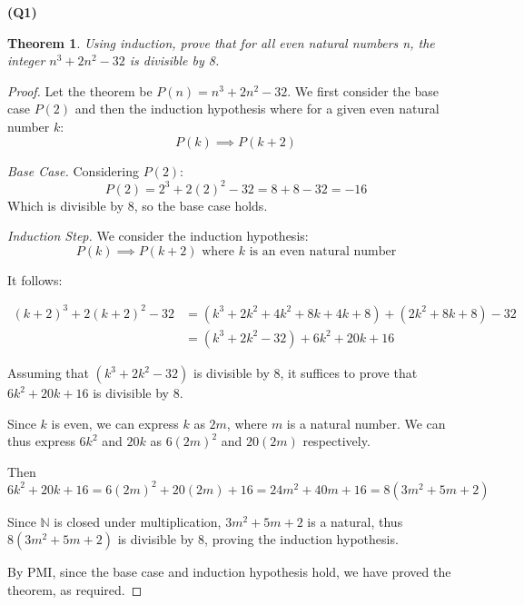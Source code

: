 \documentclass[12pt, a4paper]{article}
\newcommand{\N}{\mathbb{N}}
\newtheorem{theorem}{Theorem}
\begin{document}
\noindent\textbf{(Q1)}

\begin{theorem}
    Using induction, prove that for all even natural numbers \emph{n}, the integer
    $n^3 + 2n^2 - 32$ is divisible by 8.
\end{theorem}

\begin{proof}
    Let the theorem be $P(n) = n^3 + 2n^2 - 32$. We first consider the base case $P(2)$
    and then the induction hypothesis where for a given even natural number $k$:
    \[
        P(k) \implies P(k + 2)
    \]

    \noindent\textit{Base Case.} Considering $P(2)$:
    \[
        P(2) = 2^3 + 2(2)^2 - 32 = 8 + 8 - 32 = -16
    \]
    Which is divisible by 8, so the base case holds.

    \noindent\textit{Induction Step.} We consider the induction hypothesis:
    \[
        P(k) \implies P(k + 2) \text{ where $k$ is an even natural number}
    \]

    It follows:
    
    \begin{align*}
        (k + 2)^3 + 2(k + 2)^2 - 32 & = (k^3 + 2k^2 + 4k^2 + 8k + 4k + 8) + (2k^2 + 8k + 8) - 32\\
        & = (k^3 + 2k^2 - 32) + 6k^2 + 20k + 16
    \end{align*}

    Assuming that $(k^3 + 2k^2 - 32)$ is divisible by 8, it suffices to prove that $6k^2 + 20k + 16$
    is divisible by 8.

    Since $k$ is even, we can express $k$ as $2m$, where $m$ is a natural number. We can thus express
    $6k^2$ and $20k$ as $6(2m)^2$ and $20(2m)$ respectively.

    Then
    \[
        6k^2 + 20k + 16 = 6(2m)^2 + 20(2m) + 16 = 24m^2 + 40m + 16 = 8(3m^2 + 5m + 2)
    \]

    Since $\N$ is closed under multiplication, $3m^2 + 5m + 2$ is a natural, thus
    $8(3m^2 + 5m + 2)$ is divisible by 8, proving the induction hypothesis.

    By PMI, since the base case and induction hypothesis hold, we have proved the theorem, as
    required.
\end{proof}
\end{document}
